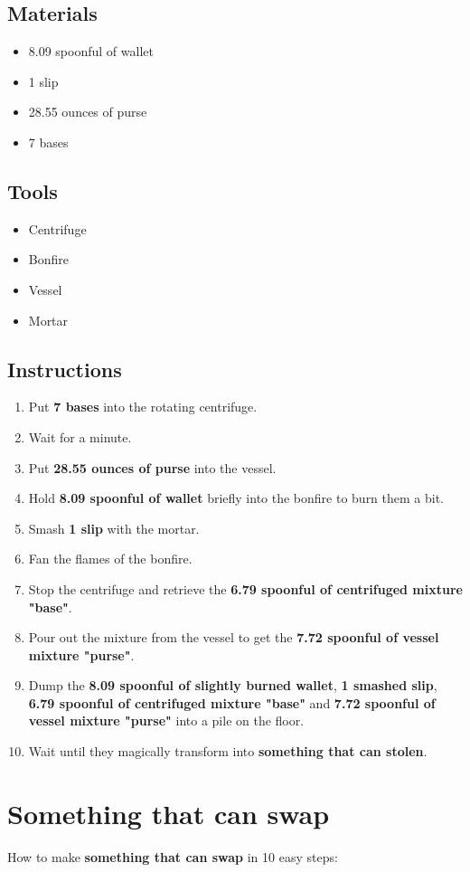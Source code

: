 \documentclass{article}
\begin{document}
\subsection{Materials}\begin{itemize}
\item 
8.09 spoonful of wallet
\item 
1 slip
\item 
28.55 ounces of purse
\item 
7 bases
\end{itemize}
\subsection{Tools}\begin{itemize}
\item 
Centrifuge
\item 
Bonfire
\item 
Vessel
\item 
Mortar
\end{itemize}
\subsection{Instructions}\begin{enumerate}
\item 
Put \textbf{7 bases} into the rotating centrifuge.
\item 
Wait for a minute.
\item 
Put \textbf{28.55 ounces of purse} into the vessel.
\item 
Hold \textbf{8.09 spoonful of wallet} briefly into the bonfire to burn them a bit.
\item 
Smash \textbf{1 slip} with the mortar.
\item 
Fan the flames of the bonfire.
\item 
Stop the centrifuge and retrieve the \textbf{6.79 spoonful of centrifuged mixture "base"}.
\item 
Pour out the mixture from the vessel to get the \textbf{7.72 spoonful of vessel mixture "purse"}.
\item 
Dump the \textbf{8.09 spoonful of slightly burned wallet}, \textbf{1 smashed slip}, \textbf{6.79 spoonful of centrifuged mixture "base"} and \textbf{7.72 spoonful of vessel mixture "purse"} into a pile on the floor.
\item 
Wait until they magically transform into \textbf{something that can stolen}.
\end{enumerate}
\newpage
\section{Something that can swap}How to make \textbf{something that can swap} in 10 easy steps:
\end{document}
